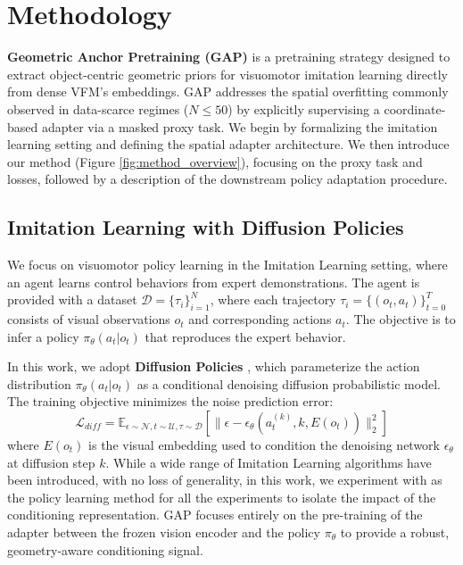 \section{Methodology}
\textbf{Geometric Anchor Pretraining (GAP)} is a pretraining strategy designed to extract object-centric geometric priors for visuomotor imitation learning directly from dense VFM's embeddings. GAP addresses the spatial overfitting commonly observed in data-scarce regimes ($N \le 50$) by explicitly supervising a coordinate-based adapter via a masked proxy task. %
We begin by formalizing the imitation learning setting and defining the spatial adapter architecture. We then introduce our method (Figure \ref{fig:method_overview}), focusing on the proxy task and losses, followed by a description of the downstream policy adaptation procedure.

\subsection{Imitation Learning with Diffusion Policies}
\label{subsec:background}
We focus on visuomotor policy learning in the Imitation Learning setting, where an agent learns control behaviors from expert demonstrations. The agent is provided with a dataset $\mathcal{D} = \{ \tau_i \}_{i=1}^N$, where each trajectory $\tau_i = \{ (o_t, a_t) \}_{t=0}^T$ consists of visual observations $o_t$ and corresponding actions $a_t$. The objective is to infer a policy $\pi_\theta(a_t | o_t)$ that reproduces the expert behavior.

In this work, we adopt \textbf{Diffusion Policies} \cite{chi2023diffusion}, which parameterize the action distribution $\pi_\theta(a_t | o_t)$ as a conditional denoising diffusion probabilistic model. The training objective minimizes the noise prediction error:
\begin{equation}
    \mathcal{L}_{diff} = \mathbb{E}_{\epsilon \sim \mathcal{N}, t \sim \mathcal{U}, \tau \sim \mathcal{D}} \left[ \| \epsilon - \epsilon_\theta(a_t^{(k)}, k, E(o_t)) \|_2^2 \right]
\end{equation}
where $E(o_t)$ is the visual embedding used to condition the denoising network $\epsilon_\theta$ at diffusion step $k$. While a wide range of Imitation Learning algorithms have been introduced, with no loss of generality, in this work, we experiment with \cite{chi2023diffusion} as the policy learning method for all the experiments to isolate the impact of the conditioning representation. GAP focuses entirely on the pre-training of the adapter between the frozen vision encoder and the policy $\pi_\theta$ to provide a robust, geometry-aware conditioning signal.

